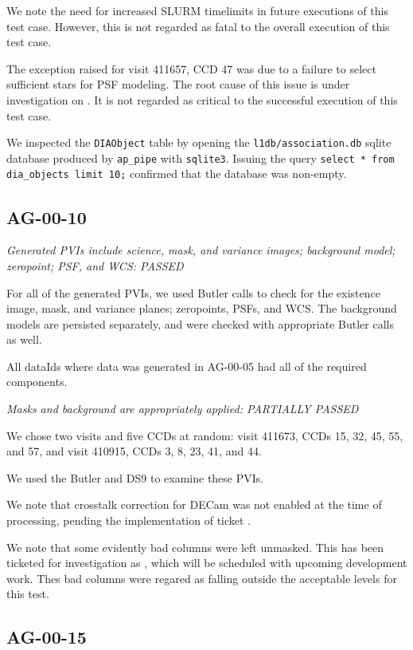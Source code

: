 \documentclass[DM,lsstdraft,STR,toc]{lsstdoc}
\begin{document}
We note the need for increased SLURM timelimits in future executions of this
test case. However, this is not regarded as fatal to the overall execution
of this test case.

The exception raised for visit 411657, CCD 47 was due to a failure to select
sufficient stars for PSF modeling. The root cause of this issue is under
investigation on . It is not regarded as critical to the
successful execution of this test case.

We inspected the \texttt{DIAObject} table by opening the
\texttt{l1db/association.db} sqlite database produced by \texttt{ap\_pipe}
with \texttt{sqlite3}. Issuing the query \texttt{select * from dia\_objects limit 10;} confirmed that the database was non-empty.

\subsection{AG-00-10}
\label{sect:ag-00-10}

\textit{Generated PVIs include science, mask, and variance images; background model; zeropoint; PSF, and WCS: PASSED}

For all of the generated PVIs, we used Butler calls to check for the existence
image, mask, and variance planes; zeropoints, PSFs, and WCS. The background models are persisted separately, and were checked with appropriate Butler calls as well.

All dataIds where data was generated in AG-00-05 had all of the required components.

\textit{Masks and background are appropriately applied: PARTIALLY PASSED}

We chose two visits and five CCDs at random:
visit 411673, CCDs 15, 32, 45, 55, and 57, and
visit 410915, CCDs 3,  8, 23, 41, and 44.

We used the Butler and DS9 to examine these PVIs.

We note that crosstalk correction for DECam was not enabled at the time of
processing, pending the implementation of ticket .

We note that some evidently bad columns were left unmasked. This has been
ticketed for investigation as , which will be scheduled with
upcoming development work. Thes bad columns were regared as falling outside
the acceptable levels for this test.

\subsection{AG-00-15}
\label{sect:ag-00-15}
\end{document}

